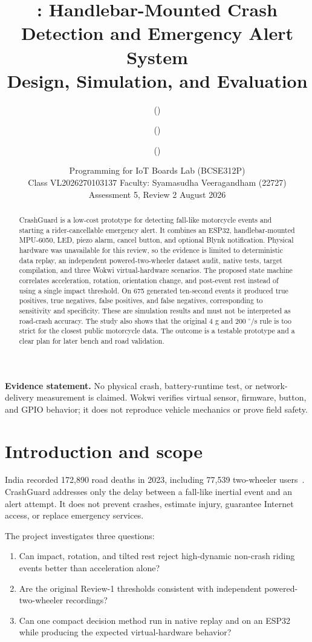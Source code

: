 \documentclass[12pt,a4paper]{article}
\title{\textbf{\ProjName: Handlebar-Mounted Crash Detection and Emergency Alert System}\\
\large Design, Simulation, and Evaluation}
\author{\TeamMemberA{} (\TeamRegA) \and
        \TeamMemberB{} (\TeamRegB) \and
        \TeamMemberC{} (\TeamRegC)}
\date{Programming for IoT Boards Lab (BCSE312P)\\
Class VL2026270103137 \quad Faculty: Syamasudha Veeragandham (22727)\\
Assessment 5, Review 2 \quad 28 August 2026}
\newcommand{\degree}{\ensuremath{^{\circ}}}
\begin{document}
\maketitle

\begin{abstract}
CrashGuard is a low-cost prototype for detecting fall-like motorcycle events
and starting a rider-cancellable emergency alert. It combines an ESP32,
handlebar-mounted MPU-6050, LED, piezo alarm, cancel button, and optional Blynk
notification. Physical hardware was unavailable for this review, so the
evidence is limited to deterministic data replay, an independent
powered-two-wheeler dataset audit, native tests, target compilation, and three
Wokwi virtual-hardware scenarios. The proposed state machine correlates
acceleration, rotation, orientation change, and post-event rest instead of
using a single impact threshold. On 675 generated ten-second events it
produced \VTwoTP{} true positives, \VTwoTN{} true negatives,
\VTwoFP{} false positives, and \VTwoFN{} false negatives, corresponding to
\VTwoSensitivity{} sensitivity and \VTwoSpecificity{} specificity. These are
simulation results and must not be interpreted as road-crash accuracy. The
study also shows that the original 4 g and 200 $\degree$/s rule is too strict
for the closest public motorcycle data. The outcome is a testable prototype
and a clear plan for later bench and road validation.
\end{abstract}

\noindent\textbf{Evidence statement.}
No physical crash, battery-runtime test, or network-delivery measurement is
claimed. Wokwi verifies virtual sensor, firmware, button, and GPIO behavior;
it does not reproduce vehicle mechanics or prove field safety.

\clearpage
\tableofcontents
\clearpage

\section{Introduction and scope}

India recorded 172,890 road deaths in 2023, including 77,539 two-wheeler
users~\cite{morth2023}. CrashGuard addresses only the delay between a
fall-like inertial event and an alert attempt. It does not prevent crashes,
estimate injury, guarantee Internet access, or replace emergency services.

The project investigates three questions:

\begin{enumerate}[label=\textbf{RQ\arabic*:}]
  \item Can impact, rotation, and tilted rest reject high-dynamic non-crash
        riding events better than acceleration alone?
  \item Are the original Review-1 thresholds consistent with independent
        powered-two-wheeler recordings?
  \item Can one compact decision method run in native replay and on an ESP32
        while producing the expected virtual-hardware behavior?
\end{enumerate}
\end{document}
